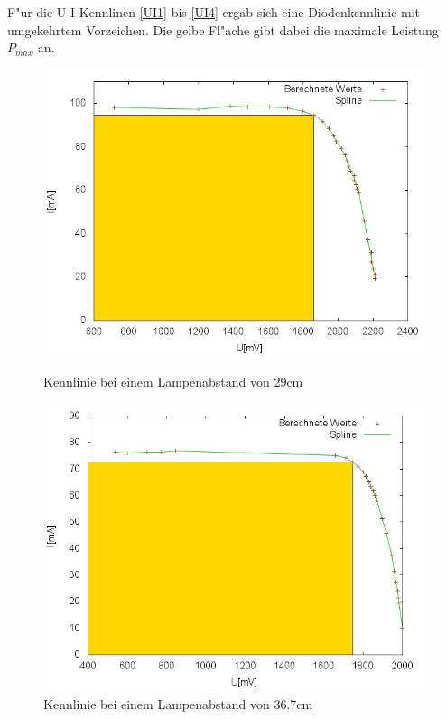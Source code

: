 	F"ur die U-I-Kennlinen \eqref{UI1} bis \eqref{UI4} ergab sich eine Diodenkennlinie mit umgekehrtem Vorzeichen.
	Die gelbe Fl"ache gibt dabei die maximale Leistung $P_{max}$ an.

	
	
	
	

	\begin{figure}[htbp]
		\centering
		\includegraphics[width = 12cm]{img/290.jpg}
		\caption{Kennlinie bei einem Lampenabstand von 29cm	}
		\label{UI1}

		\centering
		\includegraphics[width = 12cm]{img/367.jpg}
		\caption{Kennlinie bei einem Lampenabstand von 36.7cm}
		\label{UI2}
		

\end{figure}
